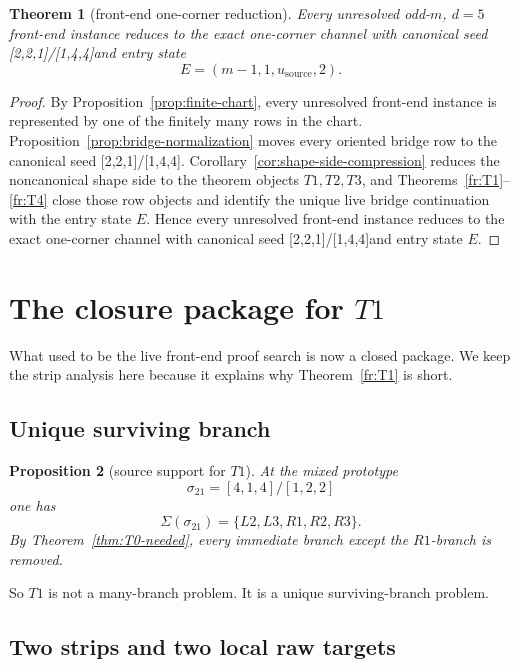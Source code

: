 \documentclass[11pt]{article}
\newtheorem{theorem}{Theorem}[section]
\newtheorem{proposition}[theorem]{Proposition}
\newcommand{\sig}[2]{\sigma_{#1#2}}
\newcommand{\CanL}{[2,2,1]}
\newcommand{\CanR}{[1,4,4]}
\newcommand{\CanSeed}{\CanL/\CanR}
\begin{document}
\begin{theorem}[front-end one-corner reduction]
\label{thm:conditional-front-end}
Every unresolved odd-$m$, $d=5$ front-end instance reduces to the exact
one-corner channel with canonical seed \CanSeed and entry state
\[
E=(m-1,1,u_{\mathrm{source}},2).
\]
\end{theorem}

\begin{proof}
By Proposition~\ref{prop:finite-chart}, every unresolved front-end instance is
represented by one of the finitely many rows in the chart.
Proposition~\ref{prop:bridge-normalization} moves every oriented bridge row to
the canonical seed \CanSeed.  Corollary~\ref{cor:shape-side-compression}
reduces the noncanonical shape side to the theorem objects \(T1,T2,T3\),
and Theorems~\ref{fr:T1}--\ref{fr:T4} close those row objects and identify
the unique live bridge continuation with the entry state \(E\).  Hence every
unresolved front-end instance reduces to the exact one-corner channel with
canonical seed \CanSeed and entry state \(E\).
\end{proof}

\section{\texorpdfstring{The closure package for \(T1\)}{The closure package for T1}}

What used to be the live front-end proof search is now a closed package.
We keep the strip analysis here because it explains why Theorem~\ref{fr:T1} is
short.

\subsection{Unique surviving branch}

\begin{proposition}[source support for \(T1\)]
\label{prop:T1-source-support}
At the mixed prototype
\[
\sig21=[4,1,4]/[1,2,2]
\]
one has
\[
\Sigma(\sig21)=\{L2,L3,R1,R2,R3\}.
\]
By Theorem~\ref{thm:T0-needed}, every immediate branch except the
\(R1\)-branch is removed.
\end{proposition}

So \(T1\) is not a many-branch problem.
It is a unique surviving-branch problem.

\subsection{Two strips and two local raw targets}
\end{document}
